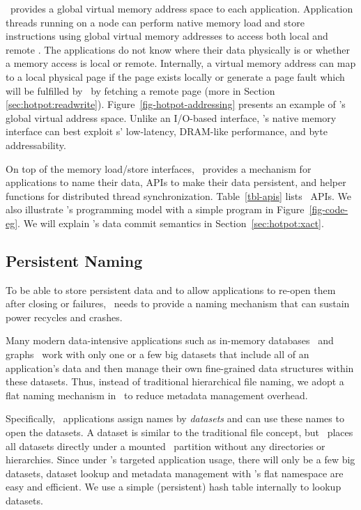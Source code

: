 \hotpot\ provides a global virtual memory address space to each application.
Application threads running on a node can perform native memory load and store instructions using global virtual memory addresses 
to access both local and remote \nvm.
The applications do not know where their data physically is or whether a memory access is local or remote.
Internally, a virtual memory address can map to a local physical page if the page exists locally or 
generate a page fault which will be fulfilled by \hotpot\ by fetching a remote page (more in Section \ref{sec:hotpot:readwrite}). 
Figure~\ref{fig-hotpot-addressing} presents an example of \hotpot's global virtual address space.
Unlike an I/O-based interface, \hotpot's native memory interface can best exploit \nvm{}s' low-latency, DRAM-like performance, and byte addressability.

On top of the memory load/store interfaces, \hotpot\ provides a mechanism for applications to 
name their data,
APIs to make their data persistent, %
and helper functions for distributed thread synchronization. 
Table~\ref{tbl-apis} lists \hotpot\ APIs.
We also illustrate \hotpot's programming model with a simple program in Figure~\ref{fig-code-eg}.
We will explain \hotpot's data commit semantics in Section~\ref{sec:hotpot:xact}.




\subsection{Persistent Naming}
\label{sec:hotpot:naming}
To be able to store persistent data and to allow applications to re-open them after closing or failures, 
\hotpot\ needs to provide a naming mechanism that can sustain power recycles and crashes. 

Many modern data-intensive applications such as in-memory databases~\cite{MongoDB} and graphs~\cite{Gonzalez14-OSDI,Gonzalez12-OSDI}
work with only one or a few big datasets that include all of an application's data 
and then manage their own fine-grained data structures within these datasets.
Thus, instead of traditional hierarchical file naming, 
we adopt a flat naming mechanism in \hotpot\ to reduce metadata management overhead. %

Specifically, \hotpot\ applications assign names by {\em datasets}
and can use these names to open the datasets.
A dataset is similar to the traditional file concept, 
but \hotpot\ places all datasets directly under a mounted \hotpot\ partition without any directories or hierarchies.
Since under \hotpot's targeted application usage, there will only be a few big datasets,
dataset lookup and metadata management with \hotpot's flat namespace are easy and efficient.
We use a simple (persistent) hash table internally to lookup datasets. 

